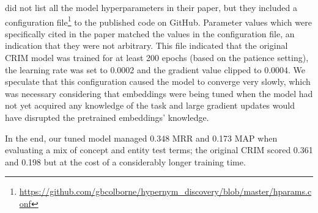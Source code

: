 \citeauthor{bernier2018crim} did not list all the model hyperparameters in their paper, but they included a configuration file\footnote{\url{https://github.com/gbcolborne/hypernym_discovery/blob/master/hparams.conf}}  to the published code on GitHub.  Parameter values which were specifically cited in the paper matched the values in the configuration file, an indication that they were not arbitrary.  This file indicated that the original CRIM model was trained for at least 200 epochs (based on the patience setting), the learning rate was set to 0.0002 and the gradient value clipped to 0.0004.  We speculate that this configuration caused the model to converge very slowly, which was necessary considering that embeddings were being tuned when the model had not yet acquired any knowledge of the task and large gradient updates would have disrupted the pretrained embeddings' knowledge.

In the end, our tuned model managed 0.348 \ac{MRR} and 0.173 \ac{MAP} when evaluating a mix of concept and entity test terms; the original CRIM scored 0.361 and 0.198 but at the cost of a considerably longer training time.

